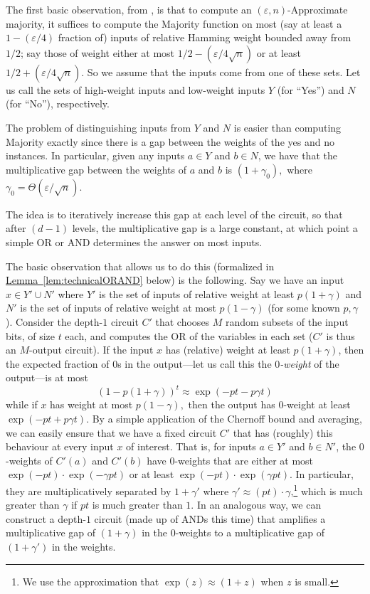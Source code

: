 \documentclass[11pt]{article}
\numberwithin{equation}{section}
\theoremstyle{definition}
\theoremstyle{plain}
\newcommand{\expref}[2]{\hyperref[#2]{#1~\ref{#2}}}
\begin{document}
The first basic observation, from \cite{odonnellwimmer}, is that to compute an $(\varepsilon,n)$-Approximate majority, it suffices to compute the Majority function on most (say at least a $1-(\varepsilon/4)$ fraction of) inputs of relative Hamming weight bounded away from $1/2$; say those of weight either at most ${1}/{2}-(\varepsilon /4\sqrt{n})$ or at least ${1}/{2}+(\varepsilon/4\sqrt{n})$. So we assume that the inputs come from one of these sets. Let us call the sets of high-weight inputs and low-weight inputs $Y$ (for ``Yes'') and 
$N$ (for ``No''),  %
respectively. 
%

The problem of distinguishing inputs from $Y$ and $N$ is easier than computing Majority exactly since there is a gap between the weights of the yes and no instances. In particular, given any inputs $a\in Y$ and $b\in N$, we have that the multiplicative gap between the weights of $a$ and $b$ is $(1+\gamma_0),$ where $\gamma_0 = \Theta(\varepsilon/\sqrt{n})$.

The idea is to iteratively increase this gap at each level of the circuit, so that after $(d-1)$ levels, the multiplicative gap is a large constant, at which point a simple OR or AND determines the answer on most inputs. 

The basic observation that allows us to do this (formalized in \expref{Lemma}{lem:technicalORAND} below) is the following. Say we have an input $x\in Y'\cup N'$ where $Y'$ is the set of inputs of relative weight at least $p(1+\gamma)$ and $N'$ is the set of inputs of relative weight at most $p(1-\gamma)$ (for some known $p,\gamma$). Consider the depth-$1$ circuit $C'$ that chooses $M$
%
random subsets of the input bits, %
%
%
of size $t$ each, 
and %
computes   %
the OR of the variables in each set ($C'$ is thus an $M$-output circuit). If the input $x$ has (relative) weight at least $p(1+\gamma)$, then the expected fraction of $0$s in the output---let us call this the \emph{$0$-weight} of the output---is at most
\[
(1-p(1+\gamma))^t\approx \exp(-pt -p\gamma t)
\]
while if $x$ has weight at most $p(1-\gamma),$ then the output has $0$-weight at least $\exp(-pt + p\gamma t)$.  By a simple application of the Chernoff bound and averaging, we can easily ensure that we have a fixed circuit $C'$ that has (roughly) this behaviour at every input $x$ of interest. That is, for inputs $a\in Y'$ and $b\in N'$, the $0$-weights of $C'(a)$ and $C'(b)$ have $0$-weights that are either at most $\exp(-pt)\cdot \exp(-\gamma pt)$ or at least $\exp(-pt)\cdot \exp(\gamma pt)$. In particular, they are multiplicatively separated by $1+\gamma'$ where $\gamma'\approx (pt)\cdot \gamma$,\footnote{We use the approximation that $\exp(z) \approx (1+z)$ when $z$ is small.} which is much
%
greater   %
than $\gamma$ if
%
$pt$ is much greater than $1$.   %
In an analogous way, we can construct a depth-$1$ circuit (made up of ANDs this time) that amplifies a multiplicative gap of $(1+\gamma)$ in the $0$-weights to a multiplicative gap of $(1+\gamma')$ in the weights. 
\end{document}
